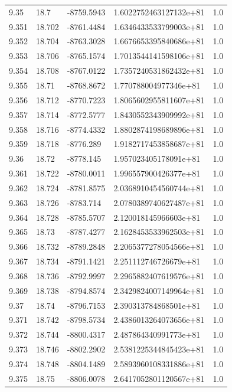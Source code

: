 \begin{tabular}{lllll}
9.35 & 18.7 & -8759.5943 & 1.6022752463127132e+81 & 1.0 \\
9.351 & 18.702 & -8761.4484 & 1.6346433533799003e+81 & 1.0 \\
9.352 & 18.704 & -8763.3028 & 1.6676653395840686e+81 & 1.0 \\
9.353 & 18.706 & -8765.1574 & 1.7013544141598106e+81 & 1.0 \\
9.354 & 18.708 & -8767.0122 & 1.7357240531862432e+81 & 1.0 \\
9.355 & 18.71 & -8768.8672 & 1.770788004977346e+81 & 1.0 \\
9.356 & 18.712 & -8770.7223 & 1.8065602955811607e+81 & 1.0 \\
9.357 & 18.714 & -8772.5777 & 1.8430552343909992e+81 & 1.0 \\
9.358 & 18.716 & -8774.4332 & 1.8802874198689896e+81 & 1.0 \\
9.359 & 18.718 & -8776.289 & 1.9182717453858687e+81 & 1.0 \\
9.36 & 18.72 & -8778.145 & 1.957023405178091e+81 & 1.0 \\
9.361 & 18.722 & -8780.0011 & 1.996557900426377e+81 & 1.0 \\
9.362 & 18.724 & -8781.8575 & 2.0368910454560744e+81 & 1.0 \\
9.363 & 18.726 & -8783.714 & 2.0780389740627487e+81 & 1.0 \\
9.364 & 18.728 & -8785.5707 & 2.120018145966603e+81 & 1.0 \\
9.365 & 18.73 & -8787.4277 & 2.1628453533962503e+81 & 1.0 \\
9.366 & 18.732 & -8789.2848 & 2.2065377278054566e+81 & 1.0 \\
9.367 & 18.734 & -8791.1421 & 2.251112746726679e+81 & 1.0 \\
9.368 & 18.736 & -8792.9997 & 2.2965882407619576e+81 & 1.0 \\
9.369 & 18.738 & -8794.8574 & 2.3429824007149964e+81 & 1.0 \\
9.37 & 18.74 & -8796.7153 & 2.390313784868501e+81 & 1.0 \\
9.371 & 18.742 & -8798.5734 & 2.4386013264073656e+81 & 1.0 \\
9.372 & 18.744 & -8800.4317 & 2.487864340991773e+81 & 1.0 \\
9.373 & 18.746 & -8802.2902 & 2.5381225344845423e+81 & 1.0 \\
9.374 & 18.748 & -8804.1489 & 2.5893960108331886e+81 & 1.0 \\
9.375 & 18.75 & -8806.0078 & 2.6417052801120567e+81 & 1.0 \\

\end{tabular}
